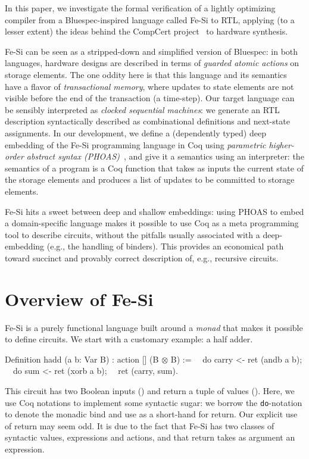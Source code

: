 \documentclass{llncs}
\newcommand{\project}{Fe-Si}
\begin{document}
\medskip In this paper, we investigate the formal verification of a
lightly optimizing compiler from a Bluespec-inspired language called
\project{} to RTL, applying (to a lesser extent) the ideas behind the
CompCert project~\cite{Leroy-backend} to hardware synthesis.

\medskip

\project{} can be seen as a stripped-down and simplified version
of Bluespec: in both languages, hardware designs are described in
terms of \emph{guarded atomic actions} on storage elements. 
%
The one oddity here is that this language and its semantics have a
flavor of \emph{transactional memory}, where updates to state
elements are not visible before the end of the transaction (a
time-step).
%
Our target language can be sensibly interpreted as \emph{clocked
  sequential machines}: we generate an RTL description syntactically
described as combinational definitions and next-state assignments.
%
In our development, we define a (dependently typed) deep embedding of
the \project{} programming language in Coq using \emph{parametric
  higher-order abstract syntax (PHOAS)}~\cite{phoas-chlipala}, and
give it a semantics using an interpreter: the semantics of a program
is a Coq function that takes as inputs the current state of the
storage elements and produces a list of updates to be committed to
storage elements.

\project{} hits a sweet between deep and shallow embeddings: using
PHOAS to embed a domain-specific language makes it possible to use Coq
as a meta programming tool to describe circuits, without the pitfalls
usually associated with a deep-embedding (e.g., the handling of
binders).
%
This provides an economical path toward succinct and provably correct
description of, e.g., recursive circuits.

\section{Overview of Fe-Si}
Fe-Si is a purely functional language built around a \emph{monad} that
makes it possible to define circuits. We start with a customary
example: a half adder.
\begin{mcoq}
Definition hadd (a b: Var B) : action [] (B $\otimes$ B) :=
$\quad$do carry <- ret (andb a b); 
$\quad$do sum    <- ret (xorb a b);
$\quad$ret (carry, sum).  
\end{mcoq}
This circuit has two Boolean inputs () and return a tuple of
values (). 
%
Here, we use Coq notations to implement some syntactic sugar: we
borrow the \texttt{do}-notation to denote the monadic bind and use
 as a short-hand for return. 
% 
Our explicit use of return may seem odd. It is due to the fact that
Fe-Si has two classes of syntactic values, expressions and actions,
and that return takes as argument an expression.
\end{document}
